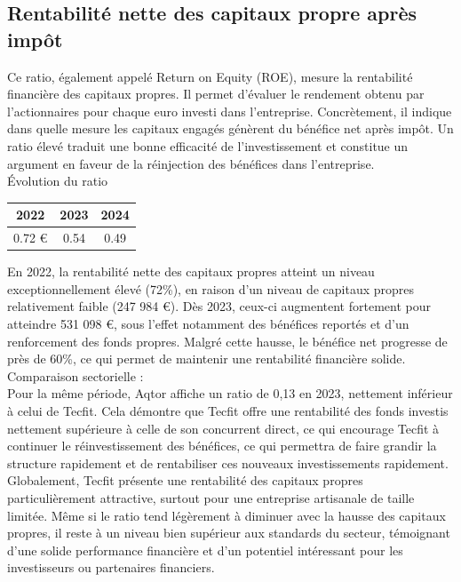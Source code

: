 \subsection{Rentabilité nette des capitaux propre après impôt}
Ce ratio, également appelé Return on Equity (ROE), mesure la rentabilité financière des capitaux propres. Il permet d’évaluer le rendement obtenu par l’actionnaires pour chaque euro investi dans l’entreprise. Concrètement, il indique dans quelle mesure les capitaux engagés génèrent du bénéfice net après impôt. Un ratio élevé traduit une bonne efficacité de l’investissement et constitue un argument en faveur de la réinjection des bénéfices dans l’entreprise.\\
Évolution du ratio\\
\begin{table}[h]
\centering
\begin{tabular}{c|c|c}
\textbf{2022} & \textbf{2023} & \textbf{2024} \\
\hline
0.72 € & 0.54 & 0.49 \\
\end{tabular}
\end{table}
En 2022, la rentabilité nette des capitaux propres atteint un niveau exceptionnellement élevé (72\%), en raison d’un niveau de capitaux propres relativement faible (247 984 €). Dès 2023, ceux-ci augmentent fortement pour atteindre 531 098 €, sous l’effet notamment des bénéfices reportés et d’un renforcement des fonds propres. Malgré cette hausse, le bénéfice net progresse de près de 60\%, ce qui permet de maintenir une rentabilité financière solide.\\
Comparaison sectorielle :\\
Pour la même période, Aqtor affiche un ratio de 0,13 en 2023, nettement inférieur à celui de Tecfit. Cela démontre que Tecfit offre une rentabilité des fonds investis nettement supérieure à celle de son concurrent direct, ce qui encourage Tecfit à continuer le réinvestissement des bénéfices, ce qui permettra de faire grandir la structure rapidement et de rentabiliser ces nouveaux investissements rapidement.\\

Globalement, Tecfit présente une rentabilité des capitaux propres particulièrement attractive, surtout pour une entreprise artisanale de taille limitée. Même si le ratio tend légèrement à diminuer avec la hausse des capitaux propres, il reste à un niveau bien supérieur aux standards du secteur, témoignant d’une solide performance financière et d’un potentiel intéressant pour les investisseurs ou partenaires financiers.



